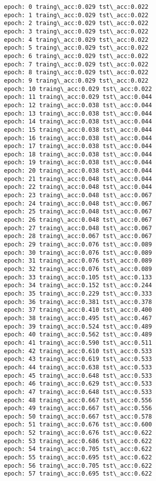\documentclass[11pt]{article}
\begin{document}
    \begin{Verbatim}[commandchars=\\\{\}]
epoch: 0 traing\_acc:0.029 tst\_acc:0.022
epoch: 1 traing\_acc:0.029 tst\_acc:0.022
epoch: 2 traing\_acc:0.029 tst\_acc:0.022
epoch: 3 traing\_acc:0.029 tst\_acc:0.022
epoch: 4 traing\_acc:0.029 tst\_acc:0.022
epoch: 5 traing\_acc:0.029 tst\_acc:0.022
epoch: 6 traing\_acc:0.029 tst\_acc:0.022
epoch: 7 traing\_acc:0.029 tst\_acc:0.022
epoch: 8 traing\_acc:0.029 tst\_acc:0.022
epoch: 9 traing\_acc:0.029 tst\_acc:0.022
epoch: 10 traing\_acc:0.029 tst\_acc:0.022
epoch: 11 traing\_acc:0.029 tst\_acc:0.044
epoch: 12 traing\_acc:0.038 tst\_acc:0.044
epoch: 13 traing\_acc:0.038 tst\_acc:0.044
epoch: 14 traing\_acc:0.038 tst\_acc:0.044
epoch: 15 traing\_acc:0.038 tst\_acc:0.044
epoch: 16 traing\_acc:0.038 tst\_acc:0.044
epoch: 17 traing\_acc:0.038 tst\_acc:0.044
epoch: 18 traing\_acc:0.038 tst\_acc:0.044
epoch: 19 traing\_acc:0.038 tst\_acc:0.044
epoch: 20 traing\_acc:0.038 tst\_acc:0.044
epoch: 21 traing\_acc:0.048 tst\_acc:0.044
epoch: 22 traing\_acc:0.048 tst\_acc:0.044
epoch: 23 traing\_acc:0.048 tst\_acc:0.067
epoch: 24 traing\_acc:0.048 tst\_acc:0.067
epoch: 25 traing\_acc:0.048 tst\_acc:0.067
epoch: 26 traing\_acc:0.048 tst\_acc:0.067
epoch: 27 traing\_acc:0.048 tst\_acc:0.067
epoch: 28 traing\_acc:0.067 tst\_acc:0.067
epoch: 29 traing\_acc:0.076 tst\_acc:0.089
epoch: 30 traing\_acc:0.076 tst\_acc:0.089
epoch: 31 traing\_acc:0.076 tst\_acc:0.089
epoch: 32 traing\_acc:0.076 tst\_acc:0.089
epoch: 33 traing\_acc:0.105 tst\_acc:0.133
epoch: 34 traing\_acc:0.152 tst\_acc:0.244
epoch: 35 traing\_acc:0.229 tst\_acc:0.333
epoch: 36 traing\_acc:0.381 tst\_acc:0.378
epoch: 37 traing\_acc:0.410 tst\_acc:0.400
epoch: 38 traing\_acc:0.495 tst\_acc:0.467
epoch: 39 traing\_acc:0.524 tst\_acc:0.489
epoch: 40 traing\_acc:0.562 tst\_acc:0.489
epoch: 41 traing\_acc:0.590 tst\_acc:0.511
epoch: 42 traing\_acc:0.610 tst\_acc:0.533
epoch: 43 traing\_acc:0.619 tst\_acc:0.533
epoch: 44 traing\_acc:0.638 tst\_acc:0.533
epoch: 45 traing\_acc:0.648 tst\_acc:0.533
epoch: 46 traing\_acc:0.629 tst\_acc:0.533
epoch: 47 traing\_acc:0.648 tst\_acc:0.533
epoch: 48 traing\_acc:0.667 tst\_acc:0.556
epoch: 49 traing\_acc:0.667 tst\_acc:0.556
epoch: 50 traing\_acc:0.667 tst\_acc:0.578
epoch: 51 traing\_acc:0.676 tst\_acc:0.600
epoch: 52 traing\_acc:0.676 tst\_acc:0.622
epoch: 53 traing\_acc:0.686 tst\_acc:0.622
epoch: 54 traing\_acc:0.705 tst\_acc:0.622
epoch: 55 traing\_acc:0.695 tst\_acc:0.622
epoch: 56 traing\_acc:0.705 tst\_acc:0.622
epoch: 57 traing\_acc:0.695 tst\_acc:0.622

\end{Verbatim}
\end{document}
